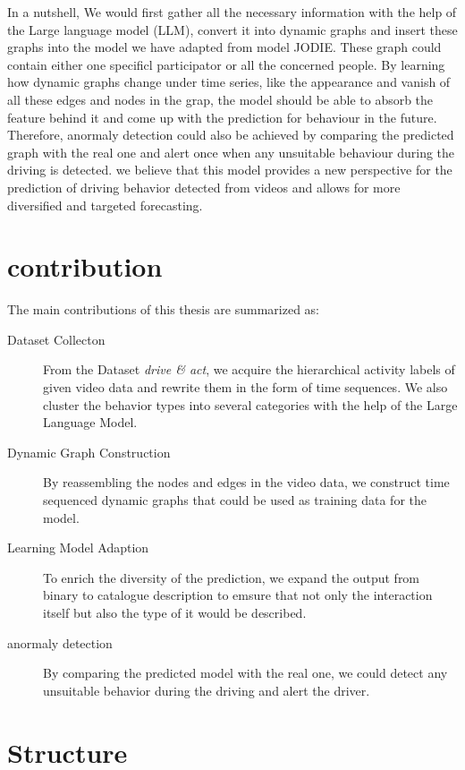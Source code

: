 In a nutshell, We would first gather all the necessary information with the help of the Large language model (LLM), convert it into dynamic graphs and insert these graphs into the model we have adapted from model JODIE. These graph could contain either one specificl participator or all the concerned people. By learning how dynamic graphs change under time series, like the appearance and vanish of all these edges and nodes in the grap, the model should be able to absorb the feature behind it and come up with the prediction for behaviour in the future. Therefore, anormaly detection could also be achieved by comparing the predicted graph with the real one and alert once when any unsuitable behaviour during the driving is detected. we believe that this model provides a new perspective for the prediction of driving behavior detected from videos and allows for more diversified and targeted forecasting.


\section{contribution}
The main contributions of this thesis are summarized as:
\begin{description}
    \item[Dataset Collecton] From the Dataset \textit{drive \& act}, we acquire the hierarchical activity labels of given video data and rewrite them in the form of time sequences. We also cluster the behavior types into several categories with the help of the Large Language Model.
    \item[Dynamic Graph Construction] By reassembling the nodes and edges in the video data, we construct time sequenced dynamic graphs that could be used as training data for the model.
    \item[Learning Model Adaption] To enrich the diversity of the prediction, we expand the output from binary to catalogue description to emsure that not only the interaction itself but also the type of it would be described.
    \item[anormaly detection] By comparing the predicted model with the real one, we could detect any unsuitable behavior during the driving and alert the driver.
\end{description}
    
    



\section{Structure}

